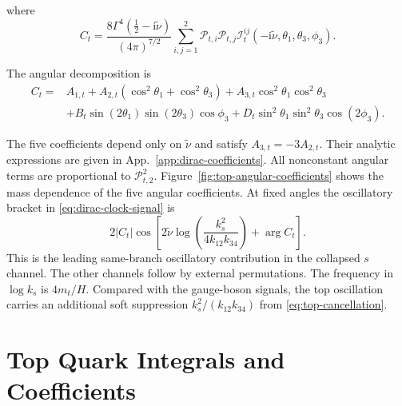 \documentclass[a4paper,12pt]{article}
\newcommand{\ii}{\mathrm i}
\newcommand{\tn}{\tilde\nu}
\begin{document}
where
\begin{equation}
 C_t=\frac{8\Gamma^4(\tfrac12-\ii\tn)}{(4\pi)^{7/2}}
 \sum_{i,j=1}^2\mathcal P_{t,i}\mathcal P_{t,j}
 \mathcal I^{ij}_t(-\ii\tn,\theta_1,\theta_3,\phi_3).
 \label{eq:dirac-clock-coefficient}
\end{equation}

The angular decomposition is
\begin{align}
 C_t={}&A_{1,t}+A_{2,t}(\cos^2\theta_1+\cos^2\theta_3)
       +A_{3,t}\cos^2\theta_1\cos^2\theta_3\nonumber\\
 &+B_t\sin(2\theta_1)\sin(2\theta_3)\cos\phi_3
  +D_t\sin^2\theta_1\sin^2\theta_3\cos(2\phi_3).
 \label{eq:dirac-angular}
\end{align}

The five coefficients depend only on $\tn$ and satisfy
$A_{3,t}=-3A_{2,t}$. Their analytic expressions are given in
App.~\ref{app:dirac-coefficients}. All nonconstant angular terms are
proportional to $\mathcal P_{t,2}^2$.
Figure~\ref{fig:top-angular-coefficients} shows the mass dependence
of the five angular coefficients.
At fixed angles the oscillatory bracket in \eqref{eq:dirac-clock-signal} is
\begin{equation}
 2|C_t|\cos\!\left[2\tn\log\!\left(\frac{k_s^2}{4k_{12}k_{34}}\right)
                   +\arg C_t\right].
 \label{eq:dirac-clock-phase}
\end{equation}
This is the leading same-branch oscillatory contribution in the
collapsed $s$ channel. The other channels follow by external permutations.
The frequency in $\log k_s$ is $4m_t/H$.
Compared with the gauge-boson signals, the top oscillation carries
an additional soft suppression $k_s^2/(k_{12} k_{34})$ from
\eqref{eq:top-cancellation}.

\appendix
\section{Top Quark Integrals and Coefficients}
\label{app:dirac-top}
\end{document}
